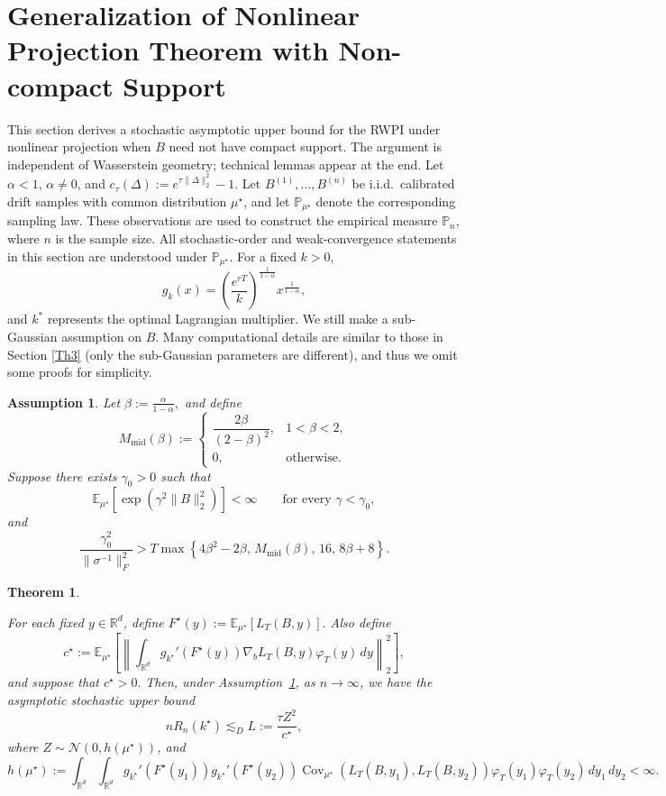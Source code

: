 \documentclass[11pt]{article}
\newtheorem{theorem}{Theorem}
\newtheorem{assumption}{Assumption}
\theoremstyle{definition}
\newcommand{\E}{\mathbb{E}}
\begin{document}
\section{Generalization of Nonlinear Projection Theorem with Non-compact Support}\label{PCLT}
{This section derives a stochastic asymptotic upper bound for the RWPI under
nonlinear projection when $B$ need not have compact support. The argument is
independent of Wasserstein geometry; technical lemmas appear at the end. Let
$\alpha<1$, $\alpha\ne0$, and
$c_\tau(\Delta):=e^{\tau\|\Delta\|_2^2}-1$. Let
$B^{(1)},\ldots,B^{(n)}$ be i.i.d.\ calibrated drift samples}
with common distribution $\mu^\star$, and let
$\mathbb P_{\mu^\star}$ denote the corresponding sampling law.
These observations are used to construct the empirical measure
$\mathbb P_n$, where $n$ is the sample size.
All stochastic-order and weak-convergence statements in this section
are understood under $\mathbb P_{\mu^\star}$. For a fixed $k > 0$, 
$$
g_k(x) = \left(\frac{e^{rT}}{k}\right)^{\frac{1}{1-\alpha}}x^{\frac{1}{1-\alpha}},
$$
and $k^*$ represents the optimal Lagrangian multiplier. We still make a sub-Gaussian assumption on $B$. Many computational details are similar to those in Section \ref{Th3} (only the sub-Gaussian parameters are different), and thus we omit some proofs for simplicity. 
\begin{assumption}\label{subGaussianCLT}
Let $\beta:=\frac{\alpha}{1-\alpha},$
and define
\[
M_{\mathrm{mid}}(\beta)
:=
\begin{cases}
\dfrac{2\beta}{(2-\beta)^2},
& 1<\beta<2,\\[2mm]
0,
& \text{otherwise}.
\end{cases}
\]
Suppose there exists $\gamma_0>0$ such that
\[
\E_{\mu^\star}
\left[
\exp\!\left(\gamma^2\|B\|_2^2\right)
\right]
<\infty
\qquad
\text{for every }\gamma<\gamma_0,
\]
and
\[
\frac{\gamma_0^2}{\|\sigma^{-1}\|_F^2}
>
T\max\left\{
4\beta^2-2\beta,\,
M_{\mathrm{mid}}(\beta),\,
16,\,
8\beta+8
\right\}.
\]
\end{assumption}
\begin{theorem}\label{CLT}

For each fixed $y\in\mathbb R^d$, define $F^\star(y)
:=
\E_{\mu^\star}
\left[
L_T(B,y)
\right].$
Also define $$c^\star
:=
\E_{\mu^\star}
\left[
\left\|
\int_{\mathbb R^d}
g_{k^\star}'\!\left(F^\star(y)\right)
\nabla_bL_T(B,y)
\varphi_T(y)\,dy
\right\|_2^2
\right],$$
and suppose that $c^\star>0.$
Then, under Assumption~\ref{subGaussianCLT}, as $n\to\infty$, we have the
asymptotic stochastic upper bound
\[
nR_n(k^\star)
\lesssim_D
L
:=
\frac{\tau Z^2}{c^\star},
\]
where $Z\sim\mathcal N\!\left(0,h(\mu^\star)\right)$,
and
\[
h(\mu^\star)
:=
\int_{\mathbb R^d}\int_{\mathbb R^d}
g_{k^\star}'\!\left(F^\star(y_1)\right)
g_{k^\star}'\!\left(F^\star(y_2)\right)
\operatorname{Cov}_{\mu^\star}\!\left(L_T(B,y_1),L_T(B,y_2)\right)
\varphi_T(y_1)\varphi_T(y_2)\,dy_1\,dy_2
<\infty.
\]
\end{theorem}
\end{document}
